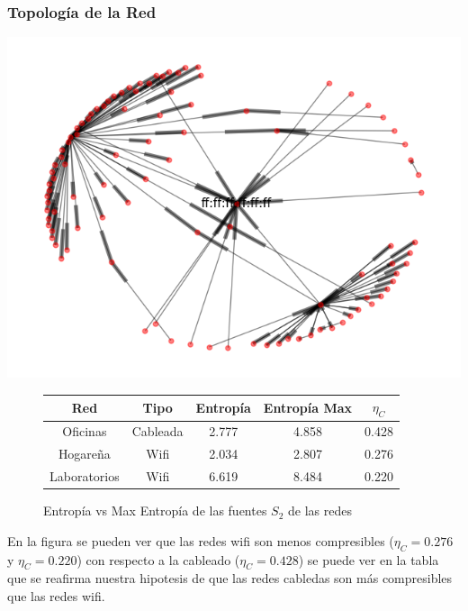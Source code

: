\subsubsection{Topolog\'ia de la Red}
\begin{center}
 \includegraphics[scale=0.6]{../plots/labos_s2_topologia.png}
\end{center}
\begin{figure}
	\centering
	\begin{tabular}{|c|c|c|c|c|}
		\hline
		Red & Tipo & Entropía & Entropía Max & $\eta_{C}$ \\
		\hline
		Oficinas & Cableada & 2.777 & 4.858 & 0.428 \\
		\hline
		Hogareña & Wifi & 2.034 & 2.807 & 0.276 \\
		\hline
		Laboratorios & Wifi & 6.619 & 8.484 & 0.220 \\
		\hline
	\end{tabular}
	\caption[fig:tabla]{Entropía vs Max Entropía de las fuentes $S_2$ de las redes}
\end{figure}

En la figura \label{fig:tabla} se pueden ver que las redes wifi son menos compresibles ($\eta_{C}=0.276$ y $\eta_{C}=0.220$)
con respecto a la cableado ($\eta_{C}=0.428$) se puede ver en la tabla que se
reafirma nuestra hipotesis de que las redes cabledas son más compresibles que
las redes wifi.
